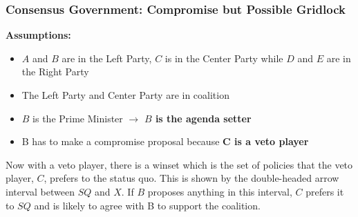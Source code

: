 \documentclass[12pt, letterpaper]{article}
\begin{document}
\subsubsection{Consensus Government: Compromise but Possible Gridlock}
\textbf{Assumptions:}
\begin{itemize}
	\item $A$ and $B$ are in the Left Party, $C$ is in the Center Party while $D$ and $E$ are in the Right Party
	\item The Left Party and Center Party are in coalition
	\item $B$ is the Prime Minister $\rightarrow$ \textbf{$B$ is the agenda setter}
	\item B has to make a compromise proposal because \textbf{C is a veto player}
\end{itemize}
\begin{center}
\end{center}
Now with a veto player, there is a winset which is the set of policies that the veto player, $C$, prefers to the status quo. This is shown by the double-headed arrow interval between $SQ$ and $X$. If $B$ proposes anything in this interval, $C$ prefers it to $SQ$ and is likely to agree with B to support the coalition.\\
\end{document}
